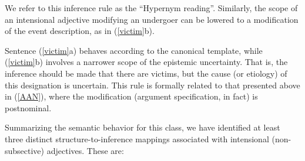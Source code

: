 \documentclass[10pt]{article}
\begin{document}
\noindent We refer to this inference rule as the ``Hypernym reading''. 
Similarly, the scope of an intensional adjective modifying an undergoer can be lowered to a modification of the event description, as  in (\ref{victim}b). 

\vspace{-0.5em}
\vspace{-0.5em}


\noindent Sentence  (\ref{victim}a) behaves according to the canonical template, while  (\ref{victim}b) involves a narrower scope of the epistemic uncertainty. That is, the inference should be made that there are victims, but the cause (or etiology) of this designation is uncertain. This rule is formally related to that presented above in (\ref{AAN}), where the modification (argument specification, in fact) is postnominal. 

\vspace{-0.5em}
\vspace{-0.5em}


\noindent Summarizing the semantic behavior for this class, we have identified at least three distinct structure-to-inference mappings associated with intensional (non-subsective) adjectives. These are:

\vspace{-0.5em}

\end{document}
